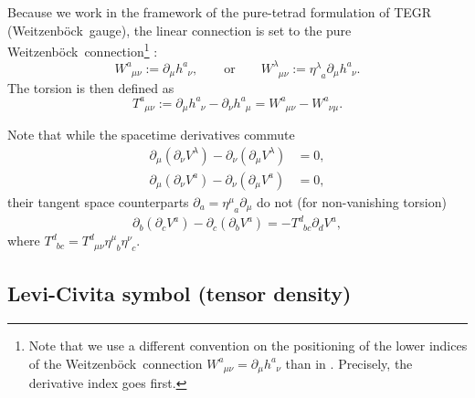 \documentclass[
10pt, %
a4paper, %
oneside, %
twocolumn,
headinclude,footinclude, %
BCOR5mm, %
]{scrartcl}
\newcommand{\pd}[1]{\partial_{#1}}
\newcommand{\tetrsymbol}{h}
\newcommand{\itetrsymbol}{\eta}
\newcommand{\itetr}[2]{\itetrsymbol^{#1}_{\phantom{#1}#2}}
\newcommand{\tetr}[2]{\tetrsymbol^{#1}_{\phantom{#1}#2}}
\newcommand{\rtetr}[2]{h^{#1}_{\mathsmaller{(r)} #2}}
\newcommand{\spin}[2]{\omega^{#1}_{\phantom{#1}#2}}
\newcommand{\D}[1]{\partial_{#1}} %
\newcommand{\Tors}[2]{T^{#1}_{\phantom{#1}#2}}
\newcommand{\w}[2]{W^{#1}_{\phantom{#1}#2}}
\newcommand{\We}{Weitzenb\"ock}
\begin{document}
	Because we work in the framework of the pure-tetrad formulation of TEGR
	(\We\ gauge), the linear connection is set to the pure \We\
	connection\footnote{Note that we use a different convention on the
	positioning of the lower indices of the \We\ connection $ \w{a}{\mu\nu} =
	\pd{\mu}\tetr{a}{\nu} $ than in \cite{AldrovandiPereiraBook}. Precisely, the
	derivative index goes first.}
	\cite{AldrovandiPereiraBook,KleinertMultivalued}: 
	\begin{equation}\label{eqn.We}
		\w{a}{\mu\nu} := \pd{\mu}\tetr{a}{\nu}, 
		\qquad
		\text{or}
		\qquad
		\w{\lambda}{\mu\nu} := \itetr{\lambda}{a}\pd{\mu}\tetr{a}{\nu}.
	\end{equation}
	The torsion is then defined as
	\begin{equation}\label{eqn.def.tors}
		\Tors{a}{\mu\nu}:=\D{\mu}\tetr{a}{\nu} - \D{\nu}\tetr{a}{\mu} = 
		\w{a}{\mu\nu} - \w{a}{\nu\mu}.
	\end{equation}
	
	Note that while the spacetime derivatives commute
	\begin{align}\label{eqn.commut.D}
		\D{\mu}(\D{\nu} V^\lambda) - \D{\nu}(\D{\mu} V^\lambda) &= 0, 
		\\[2mm] 
		\D{\mu}(\D{\nu} V^a) - \D{\nu}(\D{\mu} V^a) &= 0,
	\end{align}
	their tangent space counterparts $\D{a} =  \itetr{\mu}{a}\D{\mu}$ do not (for non-vanishing 
	torsion)
	\begin{equation}
		\D{b}(\D{c} V^a) - \D{c}(\D{b} V^a) = 
		-\Tors{d}{b c}\D{d}V^a,
	\end{equation}
	where $  \Tors{d}{bc} = \Tors{d}{\mu\nu}\itetr{\mu}{b}\itetr{\nu}{c} $.
	
	
	
	\subsection{Levi-Civita symbol (tensor density)}
	
\end{document}

